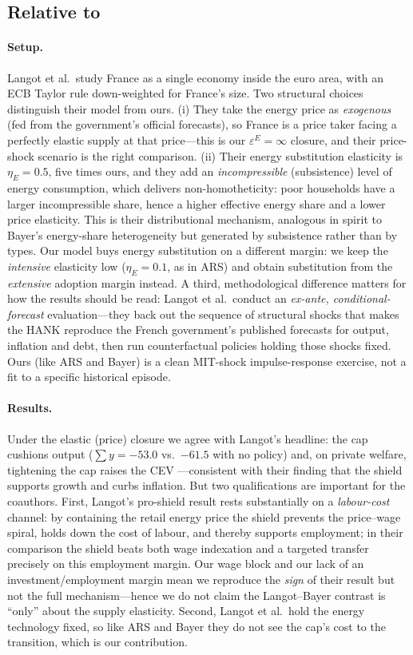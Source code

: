 \documentclass[11pt,a4paper]{article}
\begin{document}
\subsection{Relative to \citet{Langot2026}}

\paragraph{Setup.} Langot et al.\ study France as a single economy inside the
euro area, with an ECB Taylor rule down-weighted for France's size. Two
structural choices distinguish their model from ours. (i) They take the energy
price as \emph{exogenous} (fed from the government's official forecasts), so
France is a price taker facing a perfectly elastic supply at that price---this
is our $\varepsilon^E=\infty$ closure, and their price-shock scenario is the
right comparison. (ii) Their energy substitution elasticity is $\eta_E=0.5$,
five times ours, and they add an \emph{incompressible} (subsistence) level of
energy consumption, which delivers non-homotheticity: poor households have a
larger incompressible share, hence a higher effective energy share and a lower
price elasticity. This is their distributional mechanism, analogous in spirit
to Bayer's energy-share heterogeneity but generated by subsistence rather than
by types. Our model buys energy substitution on a different margin: we keep the
\emph{intensive} elasticity low ($\eta_E=0.1$, as in ARS) and obtain
substitution from the \emph{extensive} adoption margin instead. A third,
methodological difference matters for how the results should be read: Langot et
al.\ conduct an \emph{ex-ante, conditional-forecast} evaluation---they back out
the sequence of structural shocks that makes the HANK reproduce the French
government's published forecasts for output, inflation and debt, then run
counterfactual policies holding those shocks fixed. Ours (like ARS and Bayer)
is a clean MIT-shock impulse-response exercise, not a fit to a specific
historical episode.

\paragraph{Results.} Under the elastic (price) closure we agree with Langot's
headline: the cap cushions output ($\sum y = -53.0$ vs.\ $-61.5$ with no
policy) and, on private welfare, tightening the cap raises the CEV
---consistent with their finding that the shield supports
growth and curbs inflation. But two qualifications are important for the
coauthors. First, Langot's pro-shield result rests substantially on a
\emph{labour-cost} channel: by containing the retail energy price the shield
prevents the price--wage spiral, holds down the cost of labour, and thereby
supports employment; in their comparison the shield beats both wage indexation
and a targeted transfer precisely on this employment margin. Our wage block and
our lack of an investment/employment margin mean we reproduce the \emph{sign}
of their result but not the full mechanism---hence we do not claim the
Langot--Bayer contrast is ``only'' about the supply elasticity. Second, Langot
et al.\ hold the energy technology fixed, so like ARS and Bayer they do not see
the cap's cost to the transition, which is our contribution.
\end{document}
